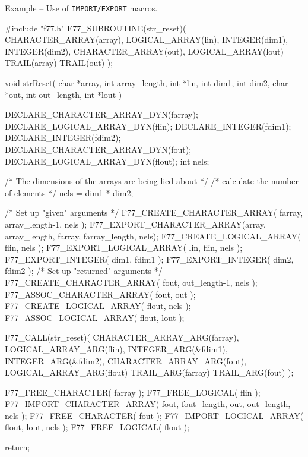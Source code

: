 \documentclass[twoside,11pt,nolof]{starlink}
\newcounter{examples}
\begin{document}
\label{cook_resetwrap}
\begin{center}
Example\latex{~\ref{cook_resetwrap}}
-- Use of \texttt{IMPORT/EXPORT} macros\@.
\end{center}
\begin{small}
\begin{terminalv}
#include "f77.h"
F77_SUBROUTINE(str_reset)( CHARACTER_ARRAY(array),
                           LOGICAL_ARRAY(lin),
                           INTEGER(dim1),
                           INTEGER(dim2),
                           CHARACTER_ARRAY(out),
                           LOGICAL_ARRAY(lout)
                           TRAIL(array)
                           TRAIL(out) );

void strReset( char *array,
               int array_length,
               int *lin,
               int dim1,
               int dim2,
               char *out,
               int out_length,
               int *lout ) {

DECLARE_CHARACTER_ARRAY_DYN(farray);
DECLARE_LOGICAL_ARRAY_DYN(flin);
DECLARE_INTEGER(fdim1);
DECLARE_INTEGER(fdim2);
DECLARE_CHARACTER_ARRAY_DYN(fout);
DECLARE_LOGICAL_ARRAY_DYN(flout);
int nels;

/* The dimensions of the arrays are being lied about */
/* calculate the number of elements */
   nels = dim1 * dim2;

/* Set up "given" arguments */
   F77_CREATE_CHARACTER_ARRAY( farray, array_length-1, nels );
   F77_EXPORT_CHARACTER_ARRAY(array, array_length, farray, farray_length, nels);
   F77_CREATE_LOGICAL_ARRAY( flin, nels );
   F77_EXPORT_LOGICAL_ARRAY( lin, flin, nels );
   F77_EXPORT_INTEGER( dim1, fdim1 );
   F77_EXPORT_INTEGER( dim2, fdim2 );
/* Set up "returned" arguments */
   F77_CREATE_CHARACTER_ARRAY( fout, out_length-1, nels );
   F77_ASSOC_CHARACTER_ARRAY( fout, out );
   F77_CREATE_LOGICAL_ARRAY( flout, nels );
   F77_ASSOC_LOGICAL_ARRAY( flout, lout );

   F77_CALL(str_reset)( CHARACTER_ARRAY_ARG(farray),
                        LOGICAL_ARRAY_ARG(flin),
                        INTEGER_ARG(&fdim1),
                        INTEGER_ARG(&fdim2),
                        CHARACTER_ARRAY_ARG(fout),
                        LOGICAL_ARRAY_ARG(flout)
                        TRAIL_ARG(farray)
                        TRAIL_ARG(fout) );

   F77_FREE_CHARACTER( farray );
   F77_FREE_LOGICAL( flin );
   F77_IMPORT_CHARACTER_ARRAY( fout, fout_length, out, out_length, nels );
   F77_FREE_CHARACTER( fout );
   F77_IMPORT_LOGICAL_ARRAY( flout, lout, nels );
   F77_FREE_LOGICAL( flout );

   return;
}
\end{terminalv}
\end{small}
\end{document}
